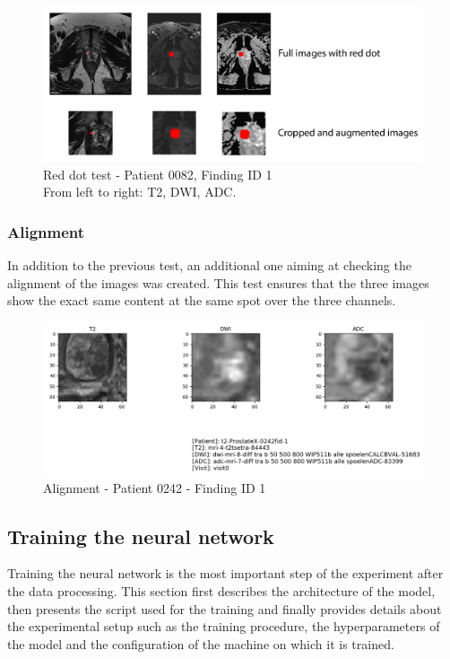 \begin{figure}[!h]
\centering
\includegraphics[width=\textwidth, keepaspectratio=true]{./figures/test_red_dot.png}
\caption{Red dot test - Patient 0082, Finding ID 1\\From left to right: T2, DWI, ADC.}
\label{fig:reddot}
\end{figure}



\subsubsection{Alignment}
In addition to the previous test, an additional one aiming at checking the alignment of the images was created. This test ensures that the three images show the exact same content at the same spot over the three channels. 

\begin{figure}[!h]
\centering
\includegraphics[width=\textwidth, keepaspectratio=true]{./figures/alignment.png}
\caption{Alignment - Patient 0242 - Finding ID 1}
\label{fig:alignment}
\end{figure}


\subsection{Training the neural network}
Training the neural network is the most important step of the experiment after the data processing. This section first describes the architecture of the model, then presents the script used for the training and finally provides details about the experimental setup such as the training procedure, the hyperparameters of the model and the configuration of the machine on which it is trained.

